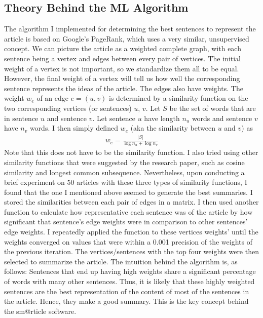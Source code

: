 \documentclass[11pt, margin=1in]{article}
\newcommand{\card}[1]{\ensuremath{\left\vert#1\right\vert}}
\begin{document}
\subsection{Theory Behind the ML Algorithm}
The algorithm I implemented for determining the best sentences to represent the article is based on Google's PageRank, which uses a very similar, unsupervised concept.  We can picture the article as a weighted complete graph, with each sentence being a vertex and edges between every pair of vertices.  The initial weight of a vertex is not important, so we standardize them all to be equal.  However, the final weight of a vertex will tell us how well the corresponding sentence represents the ideas of the article.
The edges also have weights.  The weight $w_e$ of an edge $e = (u, v)$ is determined by a similarity function on the two corresponding vertices (or sentences) $u$, $v$.  Let $S$ be the set of words that are in sentence $u$ and sentence $v$.  Let sentence $u$ have length $n_u$ words and sentence $v$ have $n_v$ words.  I then simply defined $w_e$ (aka the similarity between $u$ and $v$) as
\begin{align*}
w_e = \frac{\card{S}}{\log{n_u} + \log{n_v}}
\end{align*}
Note that this does not have to be the similarity function.  I also tried using other similarity functions that were suggested by the research paper, such as cosine similarity and longest common subsequence.  Nevertheless, upon conducting a brief experiment on 50 articles with these three types of similarity functions, I found that the one I mentioned above seemed to generate the best summaries.  I stored the similarities between each pair of edges in a matrix.  I then used another function to calculate how representative each sentence was of the article by how significant that sentence's edge weights were in comparison to other sentences' edge weights.  I repeatedly applied the function to these vertices weights' until the weights converged on values that were within a 0.001 precision of the weights of the previous iteration.  The vertices/sentences with the top four weights were then selected to summarize the article. 
The intuition behind the algorithm is, as follows: Sentences that end up having high weights share a significant percentage of words with many other sentences.  Thus, it is likely that these highly weighted sentences are the best representation of the content of most of the sentences in the article.  Hence, they make a good summary.  This is the key concept behind the sm@rticle software.              
\end{document}
